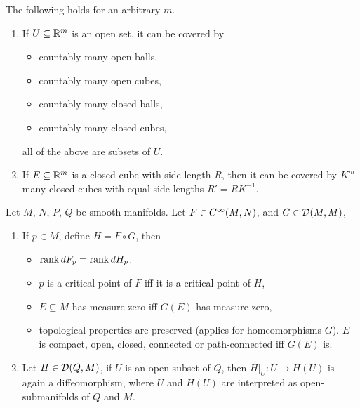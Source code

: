 \documentclass[../main-manifolds.tex]{subfiles}
\begin{document}
\begin{lemma}\label{lee-covering-lemmas}
    The following holds for an arbitrary $m$.
    \begin{enumerate}
        \item If $U\subseteq{\mathbb{R}^m}$ is an open set, it can be covered by
        \begin{itemize}
            \item countably many open balls, 
            \item countably many open cubes,
            \item countably many closed balls,
            \item countably many closed cubes,
        \end{itemize}
        all of the above are subsets of $U$.
        \item If $E\subseteq{\mathbb{R}^m}$ is a closed cube with side length $R$, then it can be covered by $K^m$ many closed cubes with equal side lengths $R'=RK^{-1}$.
    \end{enumerate}
\end{lemma}

\begin{lemma}\label{lee-diffeomorphisms-invariance}
    Let $M$, $N$, $P$, $Q$ be smooth manifolds. Let $F\in\cinf[M,N]$, and $G\in\diffeo[M,M]$,
    \begin{enumerate}
        \item If $p\in M$, define $H = F\circ G$, then
        \begin{itemize}
            \item $\operatorname{rank} dF_p = \operatorname{rank} dH_p$,
            \item $p$ is a critical point of $F$ iff it is a critical point of $H$,
            \item $E\subseteq M$ has measure zero iff $G(E)$ has measure zero,
            \item topological properties are preserved (applies for homeomorphisms $G$). $E$ is compact, open, closed, connected or path-connected iff $G(E)$ is.
        \end{itemize}
        \item Let $H\in\diffeo[Q,M]$, if $U$ is an open subset of $Q$, then $H|_{U}:U\to H(U)$ is again a diffeomorphism, where $U$ and $H(U)$ are interpreted as open-submanifolds of $Q$ and $M$.
    \end{enumerate}
\end{lemma}
\end{document}
